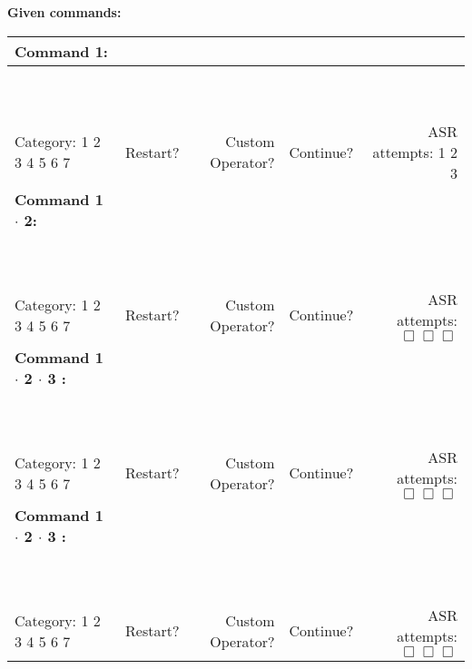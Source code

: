 {\LARGE\textbf{Given commands:}}\vspace{4mm}

\begin{table}[h]
\begin{tabularx}{\textwidth}{X r r r r}
	\textbf{\large Command 1:} & ~ & ~ & ~ & ~ \\ \hline
	\multicolumn{5}{c}{\vspace{5mm}~}  \\ \hline
	\multicolumn{5}{c}{\vspace{5mm}~}  \\ \hline
	Category: 1 2 3 4 5 6 7 \vspace{8mm} &
	Restart? & Custom Operator? & Continue? & ASR attempts: 1 2 3 \\

	\textbf{\large Command 1 $\cdot$ 2:} & ~ & ~ & ~ & ~ \\ \hline
	\multicolumn{5}{c}{\vspace{5mm}~}  \\ \hline
	\multicolumn{5}{c}{\vspace{5mm}~}  \\ \hline
	Category: 1 2 3 4 5 6 7 \vspace{8mm} &
	Restart? & Custom Operator? & Continue? & ASR attempts: $\Box \Box \Box$ \\
	
	\textbf{\large Command 1 $\cdot$ 2 $\cdot$ 3 :} & ~ & ~ & ~ & ~ \\ \hline
	\multicolumn{5}{c}{\vspace{5mm}~}  \\ \hline
	\multicolumn{5}{c}{\vspace{5mm}~}  \\ \hline
	Category: 1 2 3 4 5 6 7 \vspace{8mm} &
	Restart? & Custom Operator? & Continue? & ASR attempts: $\Box \Box \Box$ \\

	\textbf{\large Command 1 $\cdot$ 2 $\cdot$ 3 :} & ~ & ~ & ~ & ~ \\ \hline
	\multicolumn{5}{c}{\vspace{5mm}~}  \\ \hline
	\multicolumn{5}{c}{\vspace{5mm}~}  \\ \hline
	Category: 1 2 3 4 5 6 7 \vspace{8mm} &
	Restart? & Custom Operator? & Continue? & ASR attempts: $\Box \Box \Box$ \\
\end{tabularx}
\end{table}
\vspace*{\fill}

